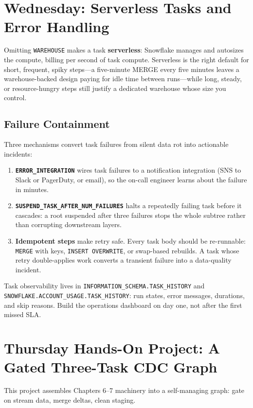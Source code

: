 \section{Wednesday: Serverless Tasks and Error Handling}
Omitting \texttt{WAREHOUSE} makes a task \textbf{serverless}: Snowflake manages and autosizes the compute, billing per second of task compute. Serverless is the right default for short, frequent, spiky steps---a five-minute MERGE every five minutes leaves a warehouse-backed design paying for idle time between runs---while long, steady, or resource-hungry steps still justify a dedicated warehouse whose size you control.

\subsection{Failure Containment}
Three mechanisms convert task failures from silent data rot into actionable incidents:
\begin{enumerate}
    \item \textbf{\texttt{ERROR\_INTEGRATION}} wires task failures to a notification integration (SNS to Slack or PagerDuty, or email), so the on-call engineer learns about the failure in minutes.
    \item \textbf{\texttt{SUSPEND\_TASK\_AFTER\_NUM\_FAILURES}} halts a repeatedly failing task before it cascades: a root suspended after three failures stops the whole subtree rather than corrupting downstream layers.
    \item \textbf{Idempotent steps} make retry safe. Every task body should be re-runnable: \texttt{MERGE} with keys, \texttt{INSERT OVERWRITE}, or swap-based rebuilds. A task whose retry double-applies work converts a transient failure into a data-quality incident.
\end{enumerate}

\begin{notebox}
Task observability lives in \texttt{INFORMATION\_SCHEMA.TASK\_HISTORY} and \texttt{SNOWFLAKE.ACCOUNT\_USAGE.TASK\_HISTORY}: run states, error messages, durations, and skip reasons. Build the operations dashboard on day one, not after the first missed SLA.
\end{notebox}

\section{Thursday Hands-On Project: A Gated Three-Task CDC Graph}
This project assembles Chapters 6--7 machinery into a self-managing graph: gate on stream data, merge deltas, clean staging.

